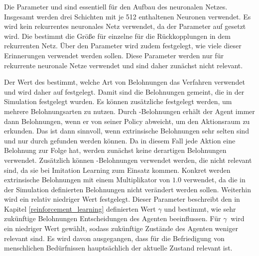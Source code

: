 Die Parameter  und  sind essentiell für den Aufbau des neuronalen Netzes. Insgesamt werden drei Schichten mit je 512 enthaltenen Neuronen verwendet. Es wird kein rekurrentes neuronales Netz verwendet, da der Parameter  auf  gesetzt wird. Die  bestimmt die Größe für einzelne  für die Rückkopplungen in dem rekurrenten Netz. Über den Parameter  wird zudem festgelegt, wie viele dieser Erinnerungen verwendet werden sollen. Diese Parameter werden nur für rekurrente neuronale Netze verwendet und sind daher zunächst nicht relevant.

Der Wert des  bestimmt, welche Art von Belohnungen das Verfahren verwendet und wird daher auf  festgelegt. Damit sind die Belohnungen gemeint, die in der Simulation festgelegt wurden. Es können zusätzliche  festgelegt werden, um mehrere Belohnungsarten zu nutzen. Durch -Belohnungen erhält der Agent immer dann Belohnungen, wenn er von seiner Policy abweicht, um den Aktionsraum zu erkunden. Das ist dann sinnvoll, wenn extrinsische Belohnungen sehr selten sind und nur durch  gefunden werden können. Da in diesem Fall jede Aktion eine Belohnung zur Folge hat, werden zunächst keine derartigen Belohnungen verwendet. Zusätzlich können -Belohnungen verwendet werden, die nicht relevant sind, da sie bei Imitation Learning zum Einsatz kommen.
Konkret werden extrinsische Belohnungen mit einem Multiplikator  von $1.0$ verwendet, da die in der Simulation definierten Belohnungen nicht verändert werden sollen. Weiterhin wird ein relativ niedriger Wert  festgelegt. Dieser Parameter beschreibt den in Kapitel \ref{reinforcement_learning} definierten Wert $ \gamma $ und bestimmt, wie sehr zukünftige Belohnungen Entscheidungen des Agenten beeinflussen. 
Für $ \gamma\ $ wird ein niedriger Wert gewählt, sodass zukünftige Zustände des Agenten weniger relevant sind. Es wird davon ausgegangen, dass für die Befriedigung von menschlichen Bedürfnissen hauptsächlich der aktuelle Zustand relevant ist. 



